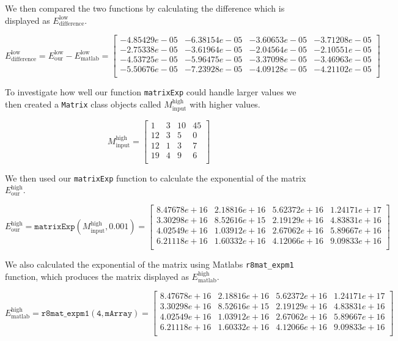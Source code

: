 \documentclass[paper=a4, fontsize=11pt]{article} %
\begin{document}
We then compared the two functions by calculating the difference which
is displayed as $E_{\text{difference}}^{\text{low}}$.


\[
  E_{\text{difference}}^{\text{low}} = E_{\text{our}}^{\text{low}} - E_{\text{matlab}}^{\text{low}} =
  \begin{bmatrix}
    -4.85429e-05 & -6.38154e-05 & -3.60653e-05 & -3.71208e-05 \\
    -2.75338e-05 & -3.61964e-05 & -2.04564e-05 & -2.10551e-05 \\
    -4.53725e-05 & -5.96475e-05 & -3.37098e-05 & -3.46963e-05 \\
    -5.50676e-05 & -7.23928e-05 & -4.09128e-05 & -4.21102e-05 \\
  \end{bmatrix}
\]

To investigate how well our function \texttt{matrixExp} could handle
larger values we then created a \texttt{Matrix} class objects called
$M_{\text{input}}^{\text{high}}$ with higher values.

\[
M_{\text{input}}^{\text{high}}=
  \begin{bmatrix}
    1 & 3 & 10 & 45 \\
    12 & 3 & 5 & 0 \\
    12 & 1 & 3 & 7 \\
    19 & 4 & 9 & 6 \\
  \end{bmatrix}
\]

We then used our \texttt{matrixExp} function to calculate the
exponential of the matrix $E_{\text{our}}^{\text{high}}$.

\[
E_{\text{our}}^{\text{high}} = \mathtt{matrixExp}(M_{\text{input}}^{\text{high}},0.001) =
  \begin{bmatrix}
 8.47678e+16 & 2.18816e+16 & 5.62372e+16 & 1.24171e+17 \\
 3.30298e+16 & 8.52616e+15 & 2.19129e+16 & 4.83831e+16 \\
 4.02549e+16 & 1.03912e+16 & 2.67062e+16 & 5.89667e+16 \\
 6.21118e+16 & 1.60332e+16 & 4.12066e+16 & 9.09833e+16 \\
  \end{bmatrix}
\]

We also calculated the exponential of the matrix using Matlabs
\texttt{r8mat\_{expm1}} function, which produces the matrix displayed
as $E_{\text{matlab}}^{\text{high}}$.

\[
E_{\text{matlab}}^{\text{high}} = \mathtt{r8mat\_{expm1}(4, mArray)} =
  \begin{bmatrix}
 8.47678e+16 & 2.18816e+16 & 5.62372e+16 & 1.24171e+17 \\
 3.30298e+16 & 8.52616e+15 & 2.19129e+16 & 4.83831e+16 \\
 4.02549e+16 & 1.03912e+16 & 2.67062e+16 & 5.89667e+16 \\
 6.21118e+16 & 1.60332e+16 & 4.12066e+16 & 9.09833e+16 \\
  \end{bmatrix}
\]
\end{document}
